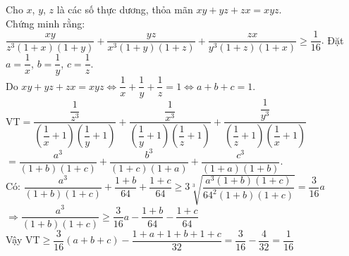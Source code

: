 \begin{ex}%
    Cho $x$, $y$, $z$ là các số thực dương, thỏa mãn $xy+yz+zx=xyz$.\\
    Chứng minh rằng: $\dfrac{xy}{z^3(1+x)(1+y)}+\dfrac{yz}{x^3(1+y)(1+z)}+\dfrac{zx}{y^3(1+z)(1+x)}\ge\dfrac{1}{16}$.
\loigiai
    {Đặt $a=\dfrac{1}{x}$, $b=\dfrac{1}{y}$, $c=\dfrac{1}{z}$.\\
    	Do $xy+yz+zx=xyz\Leftrightarrow\dfrac{1}{x}+\dfrac{1}{y}+\dfrac{1}{z}=1\Leftrightarrow a+b+c=1$.\\
    	VT$=\dfrac{\dfrac{1}{z^3}}{\left(\dfrac{1}{x}+1\right)\left(\dfrac{1}{y}+1\right)}+\dfrac{\dfrac{1}{x^3}}{\left(\dfrac{1}{y}+1\right)\left(\dfrac{1}{z}+1\right)}+\dfrac{\dfrac{1}{y^3}}{\left(\dfrac{1}{z}+1\right)\left(\dfrac{1}{x}+1\right)}$\\
    	$=\dfrac{a^3}{(1+b)(1+c)}+\dfrac{b^3}{(1+c)(1+a)}+\dfrac{c^3}{(1+a)(1+b)}$.\\
    	Có: $\dfrac{a^3}{(1+b)(1+c)}+\dfrac{1+b}{64}+\dfrac{1+c}{64}\ge3\sqrt[3]{\dfrac{a^3(1+b)(1+c)}{64^2(1+b)(1+c)}}=\dfrac{3}{16}a$\\
    	$\Rightarrow\dfrac{a^3}{(1+b)(1+c)}\ge\dfrac{3}{16}a-\dfrac{1+b}{64}-\dfrac{1+c}{64}$\\
    	Vậy VT$\ge\dfrac{3}{16}(a+b+c)-\dfrac{1+a+1+b+1+c}{32}=\dfrac{3}{16}-\dfrac{4}{32}=\dfrac{1}{16}$}
\end{ex}


